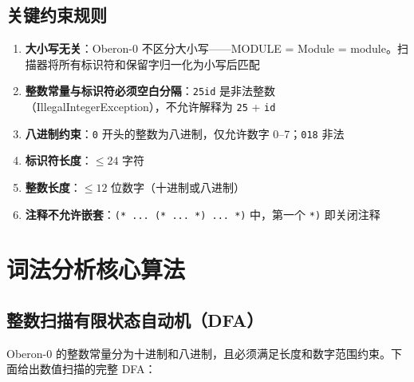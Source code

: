 \documentclass[12pt,a4paper,fontset=none]{ctexart}
\begin{document}
\subsection{关键约束规则}

\begin{plainBox}
\begin{enumerate}
  \item \textbf{大小写无关}：Oberon-0 不区分大小写——MODULE = Module = module。扫描器将所有标识符和保留字归一化为小写后匹配
  \item \textbf{整数常量与标识符必须空白分隔}：\texttt{25id} 是非法整数（IllegalIntegerException），不允许解释为 \texttt{25} + \texttt{id}
  \item \textbf{八进制约束}：\texttt{0} 开头的整数为八进制，仅允许数字 0--7；\texttt{018} 非法
  \item \textbf{标识符长度}：$\le 24$ 字符
  \item \textbf{整数长度}：$\le 12$ 位数字（十进制或八进制）
  \item \textbf{注释不允许嵌套}：\texttt{(* ... (* ... *) ... *)} 中，第一个 \texttt{*)} 即关闭注释
\end{enumerate}
\end{plainBox}

\section{词法分析核心算法}

\subsection{整数扫描有限状态自动机（DFA）}

Oberon-0 的整数常量分为十进制和八进制，且必须满足长度和数字范围约束。下面给出数值扫描的完整 DFA：
\end{document}
